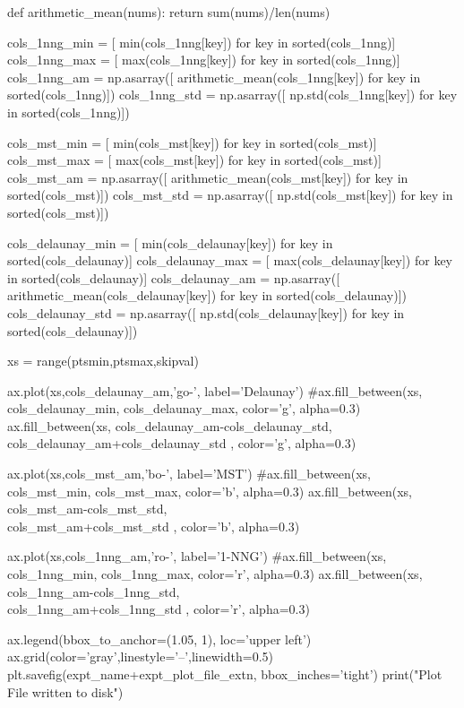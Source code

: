      def arithmetic_mean(nums):
          return sum(nums)/len(nums)
     
     cols_1nng_min = [ min(cols_1nng[key]) for key in sorted(cols_1nng)]
     cols_1nng_max = [ max(cols_1nng[key]) for key in sorted(cols_1nng)]
     cols_1nng_am  = np.asarray([ arithmetic_mean(cols_1nng[key]) for key in sorted(cols_1nng)])
     cols_1nng_std = np.asarray([ np.std(cols_1nng[key]) for key in sorted(cols_1nng)])
     
     cols_mst_min = [ min(cols_mst[key]) for key in sorted(cols_mst)]
     cols_mst_max = [ max(cols_mst[key]) for key in sorted(cols_mst)]
     cols_mst_am  = np.asarray([ arithmetic_mean(cols_mst[key]) for key in sorted(cols_mst)])
     cols_mst_std = np.asarray([ np.std(cols_mst[key]) for key in sorted(cols_mst)])
     
     cols_delaunay_min = [ min(cols_delaunay[key]) for key in sorted(cols_delaunay)]
     cols_delaunay_max = [ max(cols_delaunay[key]) for key in sorted(cols_delaunay)]
     cols_delaunay_am = np.asarray([ arithmetic_mean(cols_delaunay[key]) for key in sorted(cols_delaunay)])
     cols_delaunay_std = np.asarray([ np.std(cols_delaunay[key]) for key in sorted(cols_delaunay)])

     xs = range(ptsmin,ptsmax,skipval)

     ax.plot(xs,cols_delaunay_am,'go-', label='Delaunay')
     #ax.fill_between(xs, cols_delaunay_min, cols_delaunay_max,  color='g', alpha=0.3)     
     ax.fill_between(xs, cols_delaunay_am-cols_delaunay_std, \\
                         cols_delaunay_am+cols_delaunay_std ,  color='g', alpha=0.3)     
     
     ax.plot(xs,cols_mst_am,'bo-', label='MST')
     #ax.fill_between(xs, cols_mst_min, cols_mst_max,  color='b', alpha=0.3)     
     ax.fill_between(xs, cols_mst_am-cols_mst_std, \\
                         cols_mst_am+cols_mst_std ,  color='b', alpha=0.3)     

     ax.plot(xs,cols_1nng_am,'ro-', label='1-NNG')
     #ax.fill_between(xs, cols_1nng_min, cols_1nng_max,  color='r', alpha=0.3)     
     ax.fill_between(xs, cols_1nng_am-cols_1nng_std, \\
                         cols_1nng_am+cols_1nng_std ,  color='r', alpha=0.3)     

     ax.legend(bbox_to_anchor=(1.05, 1), loc='upper left')
     ax.grid(color='gray',linestyle='--',linewidth=0.5)
     plt.savefig(expt_name+expt_plot_file_extn, bbox_inches='tight')
     print("Plot File written to disk")
\nwendcode{}\nwdocspar
     
